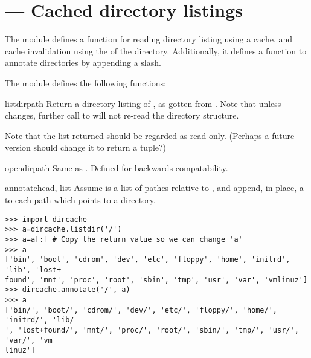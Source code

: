 \section{ ---
         Cached directory listings}


The  module defines a function for reading directory listing
using a cache, and cache invalidation using the  of the directory.
Additionally, it defines a function to annotate directories by appending
a slash.

The  module defines the following functions:

\begin{funcdesc}{listdir}{path}
Return a directory listing of , as gotten from
. Note that unless  changes, further call
to  will not re-read the directory structure.

Note that the list returned should be regarded as read-only. (Perhaps
a future version should change it to return a tuple?)
\end{funcdesc}

\begin{funcdesc}{opendir}{path}
Same as . Defined for backwards compatability.
\end{funcdesc}

\begin{funcdesc}{annotate}{head, list}
Assume  is a list of pathes relative to , and append,
in place, a \character{/} to each path which points to a directory.
\end{funcdesc}

\begin{verbatim}
>>> import dircache
>>> a=dircache.listdir('/')
>>> a=a[:] # Copy the return value so we can change 'a'
>>> a
['bin', 'boot', 'cdrom', 'dev', 'etc', 'floppy', 'home', 'initrd', 'lib', 'lost+
found', 'mnt', 'proc', 'root', 'sbin', 'tmp', 'usr', 'var', 'vmlinuz']
>>> dircache.annotate('/', a)
>>> a
['bin/', 'boot/', 'cdrom/', 'dev/', 'etc/', 'floppy/', 'home/', 'initrd/', 'lib/
', 'lost+found/', 'mnt/', 'proc/', 'root/', 'sbin/', 'tmp/', 'usr/', 'var/', 'vm
linuz']
\end{verbatim}
